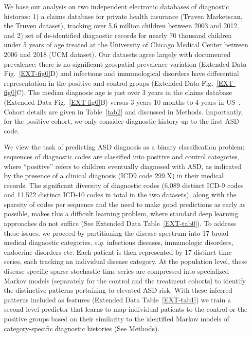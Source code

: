 \documentclass[onecolumn,,10pt]{IEEEtran}
\def\treatment{positive\xspace}
\begin{document}
We base our analysis on two independent  electronic databases of  diagnostic histories: 1)  a  claims database for private health insurance (Truven Marketscan, the Truven dataset), tracking over 5.6 million children between  2003 and 2012, and 2) set of  de-identified diagnostic records  for nearly $70$ thousand children under 5 years of age treated at the  University of Chicago Medical Center between 2006 and 2018 (UCM dataset). Our datasets agree largely  with documented prevalence: there is no significant geospatial prevalence variation (Extended Data Fig.~\ref{EXT-fig0}D) and   infections and immunological disorders have differential representation in the \treatment and control groups (Extended Data Fig.~\ref{EXT-fig0}C).  The  median diagnosis age is  just over  3 years in the claims database (Extended Data Fig.~\ref{EXT-fig0}B)  versus 3 years 10 months to 4 years  in US~\cite{pmid29701730}. Cohort details are given in Table~\ref{tab2} and discussed in Methods. Importantly, for the positive cohort, we only consider diagnostic history up to the first ASD code.

We view the task of predicting  ASD diagnosis   as a binary classification problem: sequences of diagnostic codes are classified into positive and control categories, where ``positive'' refers to children eventually diagnosed with ASD, as indicated by the presence of a clinical diagnosis (ICD9 code 299.X) in their medical records. The significant diversity of diagnostic codes (6,089 distinct ICD-9 codes and 11,522 distinct ICD-10 codes in total in the two datasets), along with the sparsity of codes per sequence and the need to make good predictions as early as possible,  makes this a difficult learning problem, where standard deep learning approaches do not suffice (See Extended Data Table~\ref{EXT-tab0}). To address these issues, we proceed by  partitioning the  disease spectrum into $17 $ broad medical diagnostic categories, $e.g.$ infectious diseases, immunologic disorders, endocrine disorders etc. Each patient is then represented by 17 distinct time series, each  tracking an individual disease category. At the population level, these disease-specific sparse stochastic time series are  compressed into specialized Markov models (separately for the control and the treatment cohorts) to identify  the distinctive patterns  pertaining to elevated ASD risk. With these inferred patterns included as features (Extended Data Table~\ref{EXT-tab1}) we train a second level predictor that learns to map   individual patients  to the control or the \treatment groups based on their  similarity  to the identified  Markov models of category-specific diagnostic histories (See Methods). %
\end{document}
